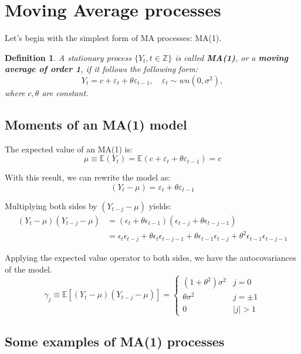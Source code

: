 \documentclass[11pt, a4paper]{report}
\theoremstyle{plain}
\theoremstyle{plain}
\newtheorem{defn}{Definition}[section]
\theoremstyle{remark}
\begin{document}
\section{Moving Average processes}

Let's begin with the simplest form of MA processes: MA(1). 
\begin{defn} \label{ma1-def}
	A stationary process $\{Y_t, t \in \mathbb{Z} \}$ is called \textbf{MA(1)}, or a \textbf{moving average of order 1}, if it follows the following form:
	$$ Y_t = c + \varepsilon_t + \theta \varepsilon_{t-1}, \hspace{1em} \varepsilon_t \sim wn(0, \sigma^2), $$
	where $c, \theta$ are constant.
\end{defn}

\subsection{Moments of an MA(1) model}

The expected value of an MA(1) is:
$$
\mu \equiv \mathbb{E}\left(Y_{t}\right)=\mathbb{E}\left(c+\varepsilon_{t}+\theta \varepsilon_{t-1}\right)=c
$$

With this result, we can rewrite the model as: 
$$
\left(Y_{t}-\mu\right)=\varepsilon_{t}+\theta \varepsilon_{t-1}
$$

Multiplying both sides by $\left(Y_{t-j}-\mu\right)$ yields:
$$
\begin{aligned}
	\left(Y_{t}-\mu\right)\left(Y_{t-j}-\mu\right) &=\left(\epsilon_{t}+\theta \epsilon_{t-1}\right)\left(\epsilon_{t-j}+\theta \epsilon_{t-j-1}\right) \\
	&=\epsilon_{t} \epsilon_{t-j}+\theta \epsilon_{t} \epsilon_{t-j-1}+\theta \epsilon_{t-1} \epsilon_{t-j}+\theta^{2} \epsilon_{t-1} \epsilon_{t-j-1}
\end{aligned}
$$

Applying the expected value operator to both sides, we have the autocovariances of the model.
$$
\gamma_{j} \equiv \mathbb{E}\left[\left(Y_{t}-\mu\right)\left(Y_{t-j}-\mu\right)\right]=\left\{\begin{array}{ll}
	\left(1+\theta^{2}\right) \sigma^{2} & j=0 \\
	\theta \sigma^{2} & j=\pm 1 \\
	0 & |j|>1
\end{array}\right.
$$

\subsection{Some examples of MA(1) processes}
\end{document}
